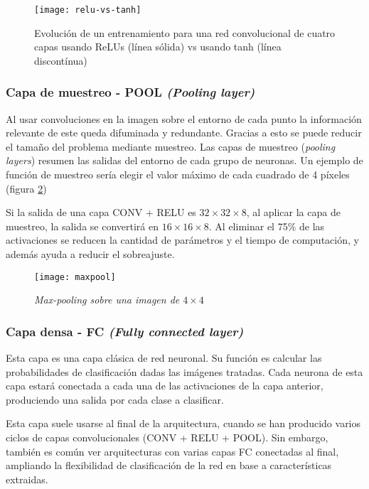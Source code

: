 \begin{figure}
    \centering
    \caption{Evolución de un entrenamiento para una red convolucional de cuatro capas usando ReLUs (línea sólida) vs usando tanh (línea discontínua) \parencite{krizhevsky2012imagenet}}
  \label{relu-vs-tanh}
  \texttt{[image: relu-vs-tanh]}
\end{figure}

\subsubsection{Capa de muestreo - POOL \textit{(Pooling layer)}}

Al usar convoluciones en la imagen sobre el entorno de cada punto la información relevante de este queda difuminada y redundante. Gracias a esto se puede reducir el tamaño del problema mediante muestreo.
Las capas de muestreo (\textit{pooling layers}) resumen las salidas del entorno de cada grupo de neuronas. Un ejemplo de función de muestreo sería elegir el valor máximo de cada cuadrado de 4 píxeles (figura \ref{maxpool})

Si la salida de una capa CONV + RELU es $32 \times 32 \times 8$, al aplicar la capa de muestreo, la salida se convertirá en $16 \times 16 \times 8$. Al eliminar el 75\% de las activaciones se reducen la cantidad de parámetros y el tiempo de computación, y además ayuda a reducir el sobreajuste.

\begin{figure}
    \centering
    \caption{\textit{Max-pooling sobre una imagen de $4\times4$}}
  \label{maxpool}
  \texttt{[image: maxpool]}
\end{figure}

\subsubsection{Capa densa - FC \textit{(Fully connected layer)}}

Esta capa es una capa clásica de red neuronal. Su función es calcular las probabilidades de clasificación dadas las imágenes tratadas. Cada neurona de esta capa estará conectada a cada una de las activaciones de la capa anterior, produciendo una salida por cada clase a clasificar.

Esta capa suele usarse al final de la arquitectura, cuando se han producido varios ciclos de capas convolucionales (CONV + RELU + POOL). Sin embargo, también es común ver arquitecturas con varias capas FC conectadas al final, ampliando la flexibilidad de clasificación de la red en base a características extraidas.

